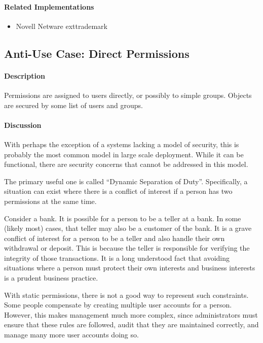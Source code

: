\paragraph{Related Implementations}

\begin{itemize}
        \item Novell Netware        exttrademark
\end{itemize}

\subsection{Anti-Use Case: Direct Permissions}

\paragraph{Description}

Permissions are assigned to users directly, or possibly to simple groups.  Objects are secured by some list of users and groups.

\paragraph{Discussion}

With perhaps the exception of a systems lacking a model of security, this is probably the most common model in large scale deployment.  While it can be functional, there are security concerns that cannot be addressed in this model.

The primary useful one is called ``Dynamic Separation of Duty''.  Specifically, a situation can exist where there is a conflict of interest if a person has two permissions at the same time.

Consider a bank.  It is possible for a person to be a teller at a bank.  In some (likely most) cases, that teller may also be a customer of the bank.  It is a grave conflict of interest for a person to be a teller and also handle their own withdrawal or deposit.  This is because the teller is responsible for verifying the integrity of those transactions.  It is a long understood fact that avoiding situations where a person must protect their own interests and business interests is a prudent business practice.

With static permissions, there is not a good way to represent such constraints.  Some people compensate by creating multiple user accounts for a person.  However, this makes management much more complex, since administrators must ensure that these rules are followed, audit that they are maintained correctly, and manage many more user accounts doing so.

